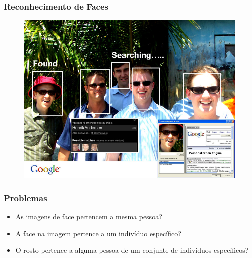 \documentclass{beamer}
\begin{document}
\begin{frame}
\frametitle{Reconhecimento de Faces}
\begin{figure}
\includegraphics[width=0.75\linewidth]{figs/google.jpg}
\end{figure}
\end{frame}

\begin{frame}
\frametitle{Problemas}
\begin{itemize}
    \item As imagens de face pertencem a mesma pessoa?
    \item A face na imagem pertence a um indivíduo específico?
    \item O rosto pertence a alguma pessoa de um conjunto de indivíduos específicos?
\end{itemize}
\end{frame}
\end{document}
